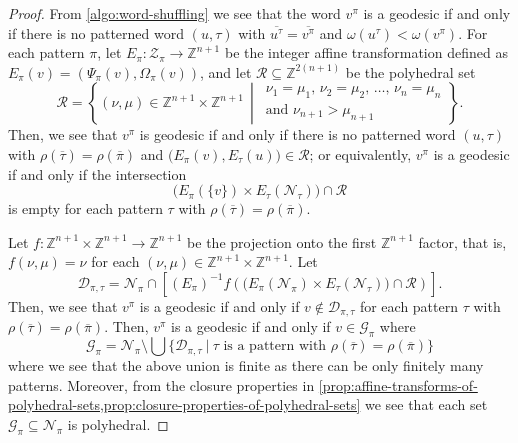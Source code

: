 \begin{proof}
From \cref{algo:word-shuffling} we see that the word $v^\pi$ is a geodesic if and only if there is no patterned word $(u,\tau)$ with $\overline{u^\tau} = \overline{v^\pi}$ and $\omega(u^\tau) < \omega(v^\pi)$.
For each pattern $\pi$, let $E_{\pi} \colon \mathcal{Z}_\pi \to \mathbb{Z}^{n+1}$ be the integer affine transformation defined as $E_{\pi} (v) = (\Psi_{\pi}(v),\Omega_{\pi}(v))$,
and let $\mathcal{R} \subseteq \mathbb{Z}^{2(n+1)}$ be the polyhedral set
\[
	\mathcal{R}
	=
	\left\{
		(\nu,\mu) \in \mathbb{Z}^{n+1} \times \mathbb{Z}^{n+1}
	\,\middle\vert\,
	\begin{aligned}
		\nu_1 = \mu_1,\,
		\nu_2 = \mu_2,\,
		\ldots,\,
		\nu_n = \mu_n\\
		\text{and }
		\nu_{n+1} > \mu_{n+1}
	\end{aligned}
	\right\}.
\]
Then, we see that $v^\pi$ is geodesic if and only if there is no patterned word $(u,\tau)$ with $\rho(\overline{\tau}) = \rho(\overline{\pi})$ and
$
	\big(E_{\pi}(v),E_{\tau}(u)\big)
	\in
	\mathcal{R}
$; or equivalently, $v^\pi$ is a geodesic if and only if the intersection
\[
	\Big(
		E_{\pi}(\{v\})
		\times
		E_{\tau}\!
			\left(\mathcal{N}_{\tau}\right)
	\Big)
	\cap
	\mathcal{R}
\]
is empty for each pattern $\tau$ with $\rho(\overline{\tau})=\rho(\overline{\pi})$.

Let $f \colon \mathbb{Z}^{n+1}\times \mathbb{Z}^{n+1} \to \mathbb{Z}^{n+1}$ be the projection onto the first $\mathbb{Z}^{n+1}$ factor, that is, $f(\nu,\mu)=\nu$ for each $(\nu,\mu) \in \mathbb{Z}^{n+1} \times \mathbb{Z}^{n+1}$.
Let
\[
	\mathcal{D}_{\pi,\tau}
	=
	\mathcal{N}_{\pi}
	\cap
	\left[
		\left(E_{\pi}\right)^{-1}
		f\left(
		\Big(
			E_{\pi}\!
			\left(\mathcal{N}_{\pi}\right)
			\times
			E_{\tau}\!
			\left(\mathcal{N}_{\tau}\right)
			\Big)
			\cap
			\mathcal{R}
		\right)
	\right]
.\]
Then, we see that $v^\pi$ is a geodesic if and only if $v \notin \mathcal{D}_{\pi,\tau}$ for each pattern $\tau$ with $\rho(\overline{\tau})=\rho(\overline{\pi})$.
Then, $v^\pi$ is a geodesic if and only if $v \in \mathcal{G}_{\pi}$ where
\[
	\mathcal{G}_{\pi}
	=
	\mathcal{N}_{\pi}
	\setminus
	\bigcup
	\Big\{
		\mathcal{D}_{\pi,\tau}
	\ \Big\vert\ 
		\tau
		\text{ is a pattern with }
		\rho(\overline{\tau})=\rho(\overline{\pi})
	\Big\}
\]
where we see that the above union is finite as there can be only finitely many patterns.
Moreover, from the closure properties in \cref{prop:affine-transforms-of-polyhedral-sets,prop:closure-properties-of-polyhedral-sets} we see that each set $\mathcal{G}_{\pi} \subseteq \mathcal{N}_\pi$ is polyhedral.
\end{proof}

